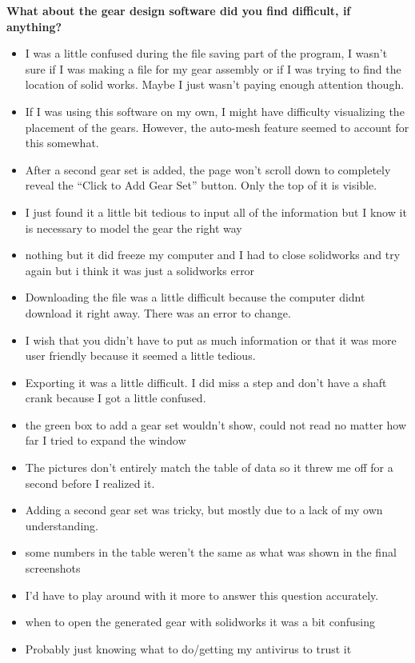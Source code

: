 \noindent\textbf{What about the gear design software did you find difficult, if anything?}
\begin{itemize}
    \item I was a little confused during the file saving part of the program, I wasn't sure if I was making a file for my gear assembly or if I was trying to find the location of solid works. Maybe I just wasn't paying enough attention though.
    \item If I was using this software on my own, I might have difficulty visualizing the placement of the gears. However, the auto-mesh feature seemed to account for this somewhat.
    \item After a second gear set is added, the page won't scroll down to completely reveal the ``Click to Add Gear Set'' button. Only the top of it is visible.
    \item I just found it a little bit tedious to input all of the information but I know it is necessary to model the gear the right way
    \item nothing but it did freeze my computer and I had to close solidworks and try again but i think it was just a solidworks error
    \item Downloading the file was a little difficult because the computer didnt download it right away. There was an error to change.
    \item I wish that you didn't have to put as much information or that it was more user friendly because it seemed a little tedious.
    \item Exporting it was a little difficult. I did miss a step and don't have a shaft crank because I got a little confused.
    \item the green box to add a gear set wouldn't show, could not read no matter how far I tried to expand the window
    \item The pictures don't entirely match the table of data so it threw me off for a second before I realized it.
    \item Adding a second gear set was tricky, but mostly due to a lack of my own understanding.
    \item some numbers in the table weren't the same as what was shown in the final screenshots
    \item I'd have to play around with it more to answer this question accurately.
    \item when to open the generated gear with solidworks it was a bit confusing
    \item Probably just knowing what to do/getting my antivirus to trust it

\end{itemize}
